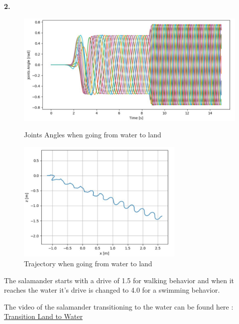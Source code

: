 \documentclass{cmc}
\begin{document}
\textbf{2.}
\begin{figure}[H]
\centering

\includegraphics[width=16cm]{9g_joint.JPG}
\caption{Joints Angles when going from water to land}

\centering

\includegraphics[width=8cm]{9g_gps.JPG}
\caption{Trajectory when going from water to land}

\label{fig:9g}
\end{figure}

The salamander starts with a drive of 1.5 for walking behavior and when it reaches the water it's drive is changed to 4.0 for a swimming behavior. 

The video of the salamander transitioning to the water can be found here : \href{https://drive.google.com/open?id=1XK0YEQ0OtI3paOIz72nGFJPvjhqrxoJy}{Transition Land to Water}\\

\newpage
\end{document}
